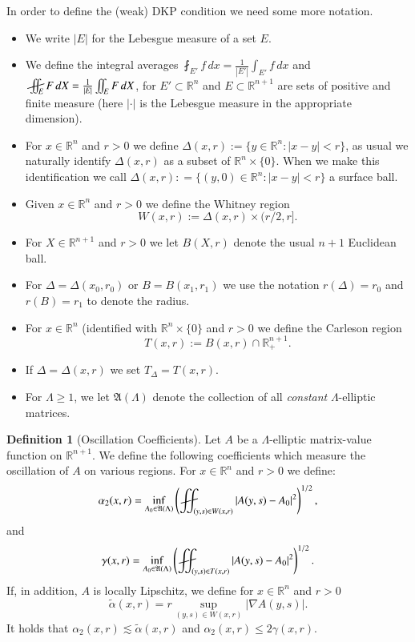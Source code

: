 \documentclass[11pt, a4paper,leqno]{amsart}
\def\Yint#1{\mathchoice
    {\YYint\displaystyle\textstyle{#1}}%
    {\YYint\textstyle\scriptstyle{#1}}%
    {\YYint\scriptstyle\scriptscriptstyle{#1}}%
    {\YYint\scriptscriptstyle\scriptscriptstyle{#1}}%
      \!\iint}
\def\YYint#1#2#3{{\setbox0=\hbox{$#1{#2#3}{\iint}$}
    \vcenter{\hbox{$#2#3$}}\kern-.51\wd0}}
\def\longdash{{-}\mkern-3.5mu{-}}
\def\tiltlongdash{\rotatebox[origin=c]{15}{$\longdash$}}
\def\fiint{\Yint\tiltlongdash}
\theoremstyle{plain}
\theoremstyle{definition}
\newtheorem{definition}[equation]{Definition}
\theoremstyle{remark}
\numberwithin{equation}{section}
\newcommand{\rn}{\mathbb{R}^n}
\newcommand{\ree}{\mathbb{R}^{n+1}}
\def\Yint#1{\mathchoice
    {\YYint\displaystyle\textstyle{#1}}%
    {\YYint\textstyle\scriptstyle{#1}}%
    {\YYint\scriptstyle\scriptscriptstyle{#1}}%
    {\YYint\scriptscriptstyle\scriptscriptstyle{#1}}%
      \!\iint}
\def\YYint#1#2#3{{\setbox0=\hbox{$#1{#2#3}{\iint}$}
    \vcenter{\hbox{$#2#3$}}\kern-.51\wd0}}
\def\longdash{{-}\mkern-3.5mu{--}}
\def\tiltlongdash{\rotatebox[origin=c]{15}{$\longdash$}}
\def\fiint{\Yint\tiltlongdash}
\begin{document}
In order to define the (weak) DKP condition we need some more notation. 
\begin{itemize}
\item We write $|E|$ for the Lebesgue measure of a set $E$. 
\item We define the integral averages $\fint_{E'} f \, dx = \tfrac{1}{|E'|} \int_{E'} f \, dx$ and $\fiint_{E} F \, dX = \tfrac{1}{|E|} \iint_{E}F \, dX$, for $E' \subset \rn$ and $E \subset \ree$ are sets of positive and finite measure (here $|\cdot|$ is the Lebesgue measure in the appropriate dimension).
\item For $x \in \rn$ and $r > 0$ we define $\Delta(x,r):= \{y \in \rn: |x- y| < r\}$, as usual we naturally identify $\Delta(x,r)$ as a subset of $\rn \times \{0\}$. When we make this identification we call $\Delta(x,r): = \{(y,0) \in \rn: |x- y| < r\}$ a surface ball.
\item Given $x \in \rn$ and $r > 0$ we define the Whitney region 
\[W(x,r) := \Delta(x,r) \times (r/2,r].\]
\item For $X \in \ree$ and $r > 0$ we let $B(X,r)$ denote the usual $n+1$ Euclidean ball.
\item For $\Delta = \Delta(x_0, r_0)$ or $B = B(x_1, r_1)$ we use the notation $r(\Delta) = r_0$ and $r(B) = r_1$ to denote the radius.
\item For $x \in \rn$ (identified with $\rn \times \{0\}$ and $r> 0$ we define the Carleson region
\[T(x,r) := B(x,r) \cap \ree_+.\]
\item If $\Delta = \Delta(x,r)$ we set $T_\Delta = T(x,r)$.
\item For $\Lambda \ge 1$, we let $\mathfrak{A}(\Lambda)$ denote the collection of all {\it constant} $\Lambda$-elliptic matrices.
\end{itemize}

\begin{definition}[Oscillation Coefficients]\label{OSCcoef.def}
Let $A$ be a $\Lambda$-elliptic matrix-value function on $\ree$. We define the following coefficients which measure the oscillation of $A$ on various regions. For $x \in \rn$ and $r > 0$ we define:
\[\alpha_2(x,r) = \inf_{A_0 \in \mathfrak{A}(\Lambda)}\left(\fiint_{(y,s) \in W(x,r)} |A(y,s) - A_0|^2 \right)^{1/2},\]
and
\[\gamma(x,r) = \inf_{A_0 \in \mathfrak{A}(\Lambda)}\left(\fiint_{(y,s) \in T(x,r)} |A(y,s) - A_0|^2 \right)^{1/2}.\]
If, in addition, $A$ is locally Lipschitz, we define for $x \in \rn$ and $r > 0$
\[\tilde{\alpha}(x,r) = r \sup_{(y,s) \in W(x,r)} |\nabla A(y,s)|.\]
It holds that $\alpha_2(x,r) \lesssim \tilde{\alpha}(x,r)$ and $\alpha_2(x,r) \le 2\gamma(x,r)$.
\end{definition}
\end{document}
